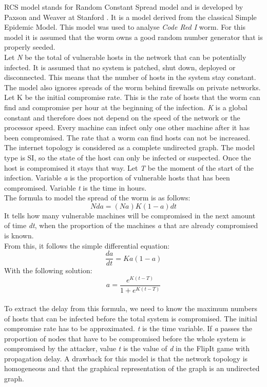 RCS model stands for Random Constant Spread model and is developed by Paxson and Weaver at Stanford \citep{OwnInternetSI}. It is a model derived from the classical Simple Epidemic Model. This model was used to analyse \textit{Code Red I} worm. For this model it is assumed that the worm owns a good random number generator that is properly seeded. \\
Let\textit{ N} be the total of vulnerable hosts in the network that can be potentially infected. It is assumed that no system is patched, shut down, deployed or disconnected. This means that the number of hosts in the system stay constant. The model also ignores spreads of the worm behind firewalls on private networks. \\ 
Let K be the initial compromise rate. This is the rate of hosts that the worm can find and compromise per hour at the beginning of the infection. \textit{K} is a global constant and therefore does not depend on the speed of the network or the processor speed.  Every machine can infect only one other machine after it has been compromised. The rate that a worm can find hosts can not be increased.
The internet topology is considered as a complete undirected graph.  The model type is SI, so the state of the host can only be infected or suspected. Once the host is compromised it stays that way.  
Let \textit{T} be the moment of the start of the infection. Variable \textit{a} is the proportion of vulnerable hosts that has been compromised. Variable \textit{t} is the time in hours. \\

The formula to model the spread of the worm is as follows:
\begin{equation}
N da = (N a)K(1 - a)dt
\end{equation}
It tells how many vulnerable machines will be compromised in the next amount of time \textit{dt}, when the proportion of the machines \textit{a} that are already compromised is known.\\

From this, it follows the simple differential equation:
\begin{equation}
\dfrac{d a}{dt} = Ka(1-a)
\end{equation}
With the following solution:
\begin{equation}
a = \dfrac{e^{K(t-T)}}{1+e^{K(t-T)}}
\end{equation}
\\

To extract the delay from this formula, we need to know the maximum numbers of hosts that can be infected before the total system is compromised. The initial compromise rate has to be approximated. \textit{t} is the time variable. If \textit{a} passes the proportion of nodes that have to be compromised before the whole system is compromised by the attacker, value \textit{t}  is the value of \textit{d} in the FlipIt game with propagation delay.
A drawback for this model is that the network topology is homogeneous and that the graphical representation of the graph is an undirected graph.  

